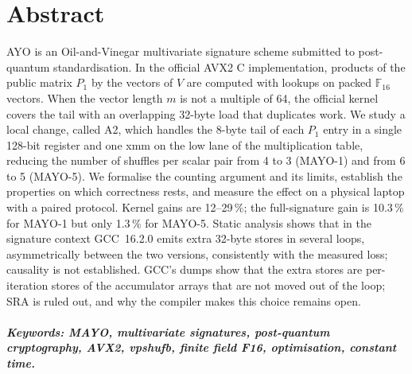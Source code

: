 \chapter*{Abstract}
\label{chap:abstract}
AYO is an Oil-and-Vinegar multivariate signature scheme submitted to post-quantum standardisation. In the official AVX2 C implementation, products of the public matrix $P_1$ by the vectors of $V$ are computed with  lookups on packed $\mathbb{F}_{16}$ vectors. When the vector length $m$ is not a multiple of 64, the official kernel covers the tail with an overlapping 32-byte load that duplicates work. We study a local change, called A2, which handles the 8-byte tail of each $P_1$ entry in a single 128-bit register and one xmm  on the low lane of the multiplication table, reducing the number of shuffles per scalar pair from 4 to 3 (MAYO-1) and from 6 to 5 (MAYO-5). We formalise the counting argument and its limits, establish the properties on which correctness rests, and measure the effect on a physical laptop with a paired protocol. Kernel gains are 12--29\,\%; the full-signature gain is 10.3\,\% for MAYO-1 but only 1.3\,\% for MAYO-5. Static analysis shows that in the signature context GCC~16.2.0 emits extra 32-byte stores in several loops, asymmetrically between the two versions, consistently with the measured loss; causality is not established. GCC's dumps show that the extra stores are per-iteration stores of the accumulator arrays that are not moved out of the loop; SRA is ruled out, and why the compiler makes this choice remains open.

\paragraph{Keywords: MAYO, multivariate signatures, post-quantum cryptography, AVX2, vpshufb, finite field F16, optimisation, constant time.}
\clearpage
